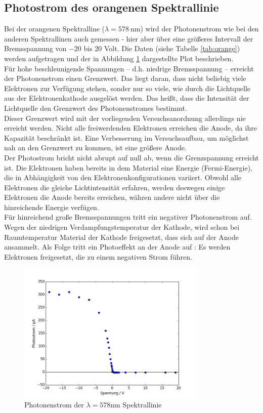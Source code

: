 \subsection{Photostrom des orangenen Spektrallinie}
Bei der orangenen Spektralline ($\lambda = \SI{578}{\nano\meter}$) wird der Photonenstrom wie bei den anderen Spektrallinen auch gemessen - hier aber über eine größeres Intervall der Bremsspannung von  \num{-20} bis \num{20} Volt. Die Daten (siehe Tabelle \ref{tab:orange}) werden aufgetragen und der in Abbildung \ref{fig:orange} dargestellte Plot beschrieben. \\
Für hohe beschleunigende Spannungen -- d.h. niedrige Bremsspannung -- erreicht der Photonenstrom einen Grenzwert. Das liegt daran, dass nicht beliebig viele Elektronen zur Verfügung stehen, sonder nur so viele, wie durch die Lichtquelle aus der Elektronenkathode ausgelöst werden. Das heißt, dass die Intensität der Lichtquelle den Grenzwert des Photonenstromes bestimmt. \\
Dieser Grenzwert wird mit der vorliegenden Versuchsanordnung allerdings nie erreicht werden. Nicht alle freiwerdenden Elektronen erreichen die Anode, da ihre Kapazität beschränkt ist. Eine Verbesserung  im Versuchsaufbau, um möglichst nah an den Grenzwert zu kommen, ist eine größere Anode. \\

Der Photostrom bricht nicht abrupt auf null ab, wenn die Grenzspannung erreicht ist. Die Elektronen haben bereits in dem Material eine Energie (Fermi-Energie), die in Abhängigkeit von den Elektronenkonfigurationen variiert. Obwohl alle Elektronen die gleiche Lichtintensität erfahren, werden deswegen einige Elektronen die Anode bereits erreichen, währen andere nicht über die hinreichende Energie verfügen. \\
Für hinreichend große Bremsspannungen tritt ein negativer Photonenstrom auf. Wegen der niedrigen Verdampfungstemperatur der Kathode, wird schon bei Raumtemperatur Material der Kathode freigesetzt, dass sich auf der Anode ansammelt. Als Folge tritt ein Photoeffekt an der Anode auf : Es werden Elektronen freigesetzt, die zu einem negativen Strom führen.

\begin{figure}[h!]
	\centering
	\includegraphics[width=0.8\textwidth]{build/OrangeWellenlange.png}
	\caption{Photonenstrom der $\lambda = 578 \si{\nano\meter}$ Spektrallinie}
	\label{fig:orange}
\end{figure}

